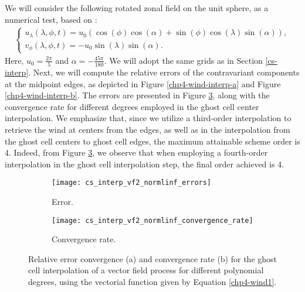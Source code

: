 We will consider the following rotated zonal field on the unit sphere, as a numerical test, based on \citet{will:1992}:
\begin{align}
	\label{chp4-wind1}
	\begin{cases}
		u_\lambda(\lambda,\phi,t) = u_0(\cos(\phi)\cos(\alpha) + \sin(\phi)\cos(\lambda)\sin(\alpha)),\\
		v_\phi(\lambda,\phi,t) = -u_0\sin(\lambda)\sin(\alpha).
	\end{cases}
\end{align}
Here, $u_0=\frac{2\pi}{5}$ and $\alpha= -\frac{45\pi}{180}$. We will adopt the same grids as in Section \ref{cs-interp}.
Next, we will compute the relative errors of the contravariant components at the midpoint edges,
as depicted in Figure \ref{chp4-wind-interp-a} and Figure \ref{chp4-wind-interp-b}.
The errors are presented in Figure \ref{chp4-expvf}, along with the convergence rate for different degrees employed in the ghost cell center interpolation.
We emphasize that, since we utilize a third-order interpolation to retrieve the wind at centers from the edges, as well as in the interpolation
from the ghost cell centers to ghost cell edges, the maximum attainable scheme order is 4.
Indeed, from Figure \ref{chp4-expvf}, we observe that when employing a fourth-order interpolation in the ghost cell interpolation step, the final order achieved is 4.
\begin{figure}[!htb]
	\centering
	\begin{subfigure}{0.45\textwidth}
		\centering
		\texttt{[image: cs\_interp\_vf2\_normlinf\_errors]}
		\caption{Error.\label{chp4-exp-vf-error}}
	\end{subfigure}
	\begin{subfigure}{0.45\textwidth}
		\centering
		\texttt{[image: cs\_interp\_vf2\_normlinf\_convergence\_rate]}
		\caption{Convergence rate.\label{chp4-exp-vf-CR}}
	\end{subfigure}
	\caption{Relative error convergence (a) and convergence rate (b) for the ghost cell interpolation of a vector field process for different
	polynomial degrees, using the vectorial function given by Equation \eqref{chp4-wind1}.\label{chp4-expvf}}
\end{figure}
